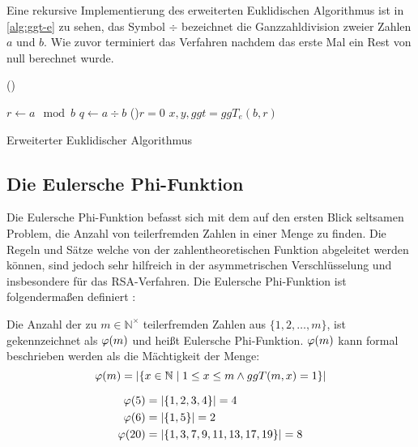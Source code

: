 \noindent
Eine rekursive Implementierung des erweiterten Euklidischen Algorithmus ist in
\autoref{alg:ggt-e} zu sehen, das Symbol $\div$ bezeichnet die Ganzzahldivision
zweier Zahlen $a$ und $b$.
Wie zuvor terminiert das Verfahren nachdem das erste
Mal ein Rest von null berechnet wurde.
\begin{algorithm}
  \DontPrintSemicolon
  \Begin(){
    $r \leftarrow a \mod{b}$\;
    $q \leftarrow a \div b$\;
    \If(){$r = 0$}{
    }
    $x,y,ggt = ggT_e(b,r)$\;

  }
  \caption{Erweiterter Euklidischer Algorithmus}
  \label{alg:ggt-e}
\end{algorithm}
\subsection{Die Eulersche Phi-Funktion}
Die Eulersche Phi-Funktion befasst sich mit dem auf den ersten Blick seltsamen
Problem, die Anzahl von teilerfremden Zahlen in einer Menge zu finden. Die Regeln
und Sätze welche von der zahlentheoretischen Funktion abgeleitet werden können, sind jedoch sehr
hilfreich in der asymmetrischen Verschlüsselung und insbesondere für das
RSA-Verfahren. Die Eulersche Phi-Funktion ist folgendermaßen definiert
\parencite[165]{BOOK:crypto} \parencite{SITE:phi-euler-fermat}:

\begin{definition}
  Die Anzahl der zu $m \in \mathbb{N}^\times$ teilerfremden Zahlen aus $\{1,2,\dots,m\}$,
  ist gekennzeichnet als $\varphi(m)$ und heißt Eulersche Phi-Funktion. $\varphi(m)$
  kann formal beschrieben werden als die Mächtigkeit der Menge:
  \begin{equation*}
    \varphi(m) = \vert \{x \in \mathbb{N} \mid 1 \leq x \leq m \wedge ggT(m,x) = 1 \} \vert
  \end{equation*}
\end{definition}

\begin{example}
  \begin{align*}
    \varphi(5)  & = \vert \{1,2,3,4\} \vert = 4             \\
    \varphi(6)  & = \vert \{1,5\} \vert = 2                 \\
    \varphi(20) & = \vert \{1,3,7,9,11,13,17,19\} \vert = 8
  \end{align*}
\end{example}

